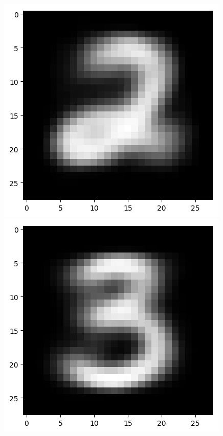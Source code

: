\documentclass[submit]{harvardml}
\begin{document}
\begin{enumerate}
        \includegraphics[scale=0.3]{figures/k3_centroids/3.png} \\
        \includegraphics[scale=0.3]{figures/k3_centroids/4.png} \\

\end{enumerate}
\end{document}
